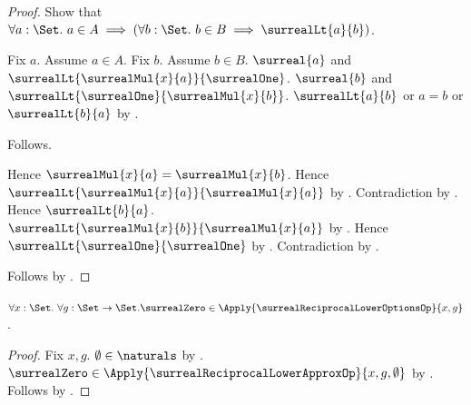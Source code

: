 \begin{proof}
    Show that $\forall a:\Set.\ a\in A\implies
        (\forall b:\Set.\ b\in B\implies\surrealLt{a}{b})$.
    \begin{subproof}
        Fix $a$.
        Assume $a\in A$.
        Fix $b$.
        Assume $b\in B$.
        $\surreal{a}$ and
            $\surrealLt{\surrealMul{x}{a}}{\surrealOne}$.
        $\surreal{b}$ and
            $\surrealLt{\surrealOne}{\surrealMul{x}{b}}$.
        $\surrealLt{a}{b}$ or $a=b$ or $\surrealLt{b}{a}$
            by .
        \begin{byCase}
                Follows.
                \begin{byCase}
                        Hence $\surrealMul{x}{a}=\surrealMul{x}{b}$.
                        Hence $\surrealLt{
                            \surrealMul{x}{a}}{
                            \surrealMul{x}{a}}$
                            by .
                        Contradiction by
                            .
                        Hence $\surrealLt{b}{a}$.
                        $\surrealLt{\surrealMul{x}{b}}
                            {\surrealMul{x}{a}}$
                            by .
                        Hence $\surrealLt{\surrealOne}{\surrealOne}$
                            by .
                        Contradiction by
                            .
                \end{byCase}
        \end{byCase}
    \end{subproof}
    Follows by .
\end{proof}

\begin{proposition}\label{surreal_zero_in_reciprocal_lower_options}
    $\forall x:\Set.\ \forall g:\Set\to\Set.
        \surrealZero\in
            \Apply{\surrealReciprocalLowerOptionsOp}{x,g}$.
\end{proposition}
\begin{proof}
    Fix $x,g$.
    $\emptyset\in\naturals$ by .
    $\surrealZero\in\Apply{\surrealReciprocalLowerApproxOp}{x,g,\emptyset}$
        by .
    Follows by .
\end{proof}


